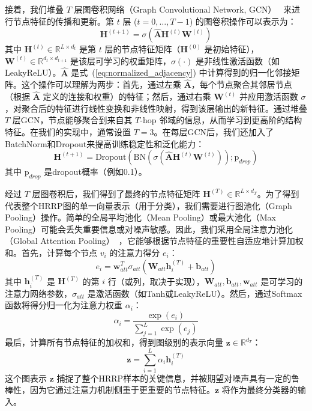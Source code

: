 接着，我们堆叠 $T$ 层图卷积网络（Graph Convolutional Network, GCN）~\cite{kipf2017semi} 来进行节点特征的传播和更新。第 $t$ 层 ($t=0, \dots, T-1$) 的图卷积操作可以表示为：
\begin{equation}
    \mathbf{H}^{(t+1)} = \sigma\left(\hat{\mathbf{A}} \mathbf{H}^{(t)} \mathbf{W}^{(t)}\right)
    \label{eq:gcn_layer}
\end{equation}
其中 $\mathbf{H}^{(t)} \in \mathbb{R}^{L \times d_t}$ 是第 $t$ 层的节点特征矩阵（$\mathbf{H}^{(0)}$ 是初始特征），$\mathbf{W}^{(t)} \in \mathbb{R}^{d_t \times d_{t+1}}$ 是该层可学习的权重矩阵，$\sigma(\cdot)$ 是非线性激活函数（如LeakyReLU）。$\hat{\mathbf{A}}$ 是式~(\ref{eq:normalized_adjacency}) 中计算得到的归一化邻接矩阵。这个操作可以理解为两步：首先，通过左乘 $\hat{\mathbf{A}}$，每个节点聚合其邻居节点（根据 $\hat{\mathbf{A}}$ 定义的连接和权重）的特征；然后，通过右乘 $\mathbf{W}^{(t)}$ 并应用激活函数 $\sigma$，对聚合后的特征进行线性变换和非线性映射，得到该层输出的新特征。通过堆叠 $T$ 层GCN，节点能够聚合到来自其 $T$-hop 邻域的信息，从而学习到更高阶的结构特征。在我们的实现中，通常设置 $T=3$。在每层GCN后，我们还加入了BatchNorm和Dropout来提高训练稳定性和泛化能力：
\begin{equation}
    \mathbf{H}^{(t+1)} = \text{Dropout}\left(\text{BN}\left(\sigma\left(\hat{\mathbf{A}} \mathbf{H}^{(t)} \mathbf{W}^{(t)}\right)\right); \text{p}_{drop}\right)
    \label{eq:gcn_layer_full}
\end{equation}
其中 $\text{p}_{drop}$ 是dropout概率（例如0.1）。

经过 $T$ 层图卷积后，我们得到了最终的节点特征矩阵 $\mathbf{H}^{(T)} \in \mathbb{R}^{L \times d_T}$。为了得到代表整个HRRP图的单一向量表示（用于分类），我们需要进行图池化（Graph Pooling）操作。简单的全局平均池化（Mean Pooling）或最大池化（Max Pooling）可能会丢失重要信息或对噪声敏感。因此，我们采用全局注意力池化（Global Attention Pooling）~\cite{velickovic2018graph}，它能够根据节点特征的重要性自适应地计算加权和。首先，计算每个节点 $v_i$ 的注意力得分 $e_i$：
\begin{equation}
    e_i = \mathbf{w}_{att}^T \sigma_{att}(\mathbf{W}_{att} \mathbf{h}_i^{(T)} + \mathbf{b}_{att})
    \label{eq:attention_score_node}
\end{equation}
其中 $\mathbf{h}_i^{(T)}$ 是 $\mathbf{H}^{(T)}$ 的第 $i$ 行（或列，取决于实现），$\mathbf{W}_{att}, \mathbf{b}_{att}, \mathbf{w}_{att}$ 是可学习的注意力网络参数，$\sigma_{att}$ 是激活函数（如Tanh或LeakyReLU）。然后，通过Softmax函数将得分归一化为注意力权重 $\alpha_i$：
\begin{equation}
    \alpha_i = \frac{\exp(e_i)}{\sum_{j=1}^L \exp(e_j)}
    \label{eq:attention_weight_node}
\end{equation}
最后，计算所有节点特征的加权和，得到图级别的表示向量 $\mathbf{z} \in \mathbb{R}^{d_T}$：
\begin{equation}
    \mathbf{z} = \sum_{i=1}^L \alpha_i \mathbf{h}_i^{(T)}
    \label{eq:graph_representation}
\end{equation}
这个图表示 $\mathbf{z}$ 捕捉了整个HRRP样本的关键信息，并被期望对噪声具有一定的鲁棒性，因为它通过注意力机制侧重于更重要的节点特征。$\mathbf{z}$ 将作为最终分类器的输入。

